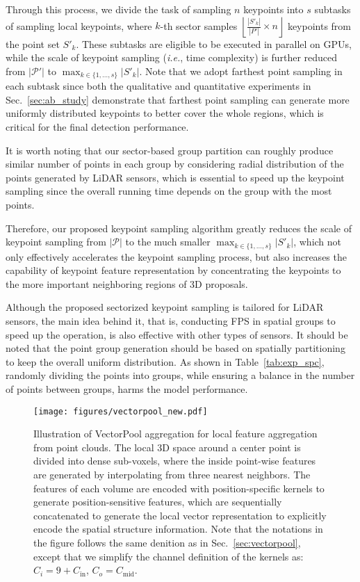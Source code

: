 \documentclass[natbib,twocolumn]{svjour3}          \smartqed  \usepackage{graphicx}
\begin{document}
Through this process, we divide the task of sampling $n$ keypoints into $s$ subtasks of sampling local keypoints, where $k$-th sector samples $\left\lfloor\frac{|S'_k|}{|P'|} \times n \right\rfloor$ keypoints from the point set $S'_k$. These subtasks are eligible to be executed in parallel on GPUs, while the scale of keypoint sampling (\emph{i.e.}, time complexity) is further reduced from $|\mathcal{P}'|$ to $\max_{k \in \{1, \dots, s\}} |S'_k|$.
Note that we adopt farthest point sampling in each subtask since both the qualitative and quantitative experiments in Sec.~\ref{sec:ab_study} demonstrate that farthest point sampling can  generate more uniformly distributed keypoints to better cover the whole regions, which is critical for the final detection performance.

It is worth noting that our sector-based group partition can roughly produce similar number of points in each group by considering radial distribution of the points generated by LiDAR sensors, which is essential to speed up the keypoint sampling since the overall running time depends on the group with the most points. 


Therefore, our proposed keypoint sampling algorithm greatly reduces the scale of keypoint sampling from $|\mathcal{P}|$ to the much smaller $\max_{k \in \{1, \dots, s\}} |S'_k|$, which not only effectively accelerates the keypoint sampling process, but also increases the capability of keypoint feature representation by concentrating the keypoints to the more important neighboring regions of 3D proposals. 


Although the proposed sectorized keypoint sampling is tailored for LiDAR sensors, the main idea behind it, that is, conducting
FPS in spatial groups to speed up the operation, is also effective with other types of sensors.  It should be noted that the point group generation should be based on
spatially partitioning to keep the overall uniform distribution. As shown in Table~\ref{tab:exp_spc}, randomly dividing the points
into groups, while ensuring a balance in the number of points between groups, harms the model
performance.


\begin{figure*}
	\begin{center}
		\texttt{[image: figures/vectorpool\_new.pdf]}
	\end{center}
	\vspace{-2mm}
	\caption{Illustration of VectorPool aggregation for local feature aggregation from point clouds. The local 3D space around a center point is divided into dense sub-voxels, where the inside point-wise features are generated by interpolating from three nearest neighbors. 
		The features of each volume are encoded with position-specific kernels to generate position-sensitive features, which are sequentially concatenated to generate the local vector representation to explicitly encode the spatial structure information.
		Note that the notations in the figure follows the same denition as in Sec.~\ref{sec:vectorpool}, except that we simplify the channel definition of the kernels as: $C_i=9+C_{\text{in}}$, $C_o=C_{\text{mid}}$.
	}
	\label{fig:vectorpool}
\end{figure*}
\end{document}
